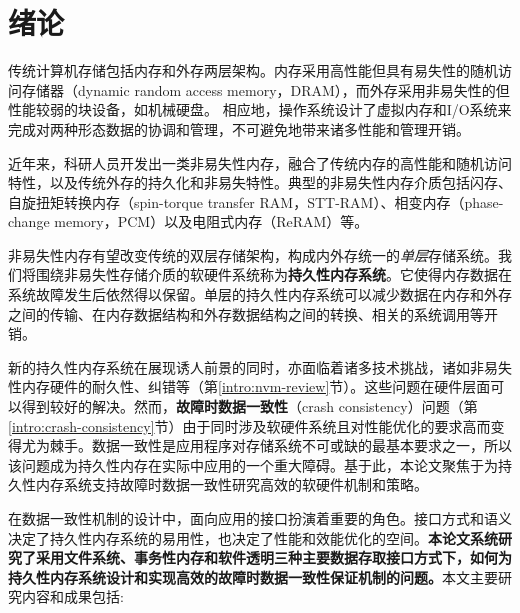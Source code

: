 \chapter{绪论}
\label{chap:intro}

传统计算机存储包括内存和外存两层架构。内存采用高性能但具有易失性的随机访问存储器（dynamic random access memory，DRAM），而外存采用非易失性的但性能较弱的块设备，如机械硬盘。
相应地，操作系统设计了虚拟内存和I/O系统\cite{Galvin:2013:OSC:2531466,Tanenbaum:2014:MOS:2655363}来完成对两种形态数据的协调和管理，不可避免地带来诸多性能和管理开销\cite{Lang:1977:DBP:320576.320585,Yu:2014:OBI:2642648.2619092}。

近年来，科研人员开发出一类非易失性内存，融合了传统内存的高性能和随机访问特性，以及传统外存的持久化和非易失特性。典型的非易失性内存介质包括闪存\cite{705361,542301}、自旋扭矩转换内存（spin-torque transfer RAM，STT-RAM）\cite{4443191,6557176}、相变内存（phase-change memory，PCM）\cite{Loke22062012,6176872,Raoux:2008:PRA,10.1109/MM.2010.24}以及电阻式内存（ReRAM）\cite{5607274}等。

非易失性内存有望改变传统的双层存储架构，构成内外存统一的\emph{单层}存储系统。我们将围绕非易失性存储介质的软硬件系统称为\textbf{持久性内存系统}。它使得内存数据在系统故障发生后依然得以保留。单层的持久性内存系统可以减少数据在内存和外存之间的传输、在内存数据结构和外存数据结构之间的转换、相关的系统调用等开销\cite{meza2013case}。

新的持久性内存系统在展现诱人前景的同时，亦面临着诸多技术挑战，诸如非易失性内存硬件的耐久性、纠错等（第\ref{intro:nvm-review}节）。这些问题在硬件层面可以得到较好的解决。然而，\textbf{故障时数据一致性}（crash consistency）问题（第\ref{intro:crash-consistency}节）由于同时涉及软硬件系统且对性能优化的要求高而变得尤为棘手。数据一致性是应用程序对存储系统不可或缺的最基本要求之一，所以该问题成为持久性内存在实际中应用的一个重大障碍\cite{Onur:2014:RPO}。基于此，本论文聚焦于为持久性内存系统支持故障时数据一致性研究高效的软硬件机制和策略。

在数据一致性机制的设计中，面向应用的接口扮演着重要的角色。接口方式和语义决定了持久性内存系统的易用性，也决定了性能和效能优化的空间。\textbf{本论文系统研究了采用文件系统、事务性内存和软件透明三种主要数据存取接口方式下，如何为持久性内存系统设计和实现高效的故障时数据一致性保证机制的问题。}本文主要研究内容和成果包括:

